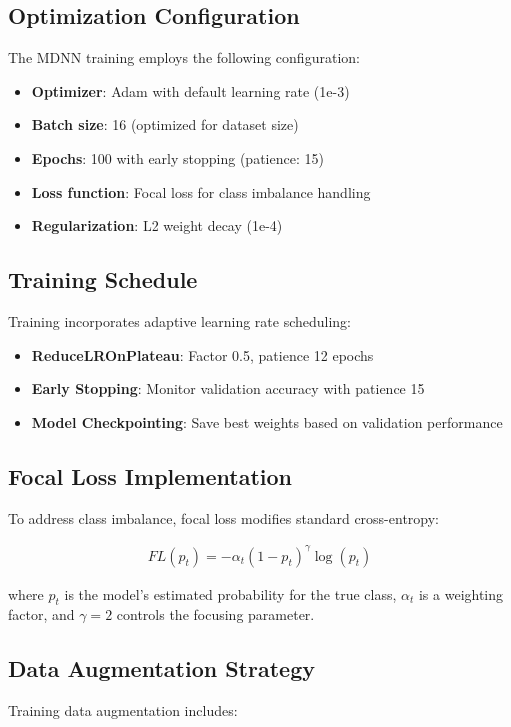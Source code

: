 \documentclass[12pt,a4paper]{article}
\begin{document}
\subsection{Optimization Configuration}
The MDNN training employs the following configuration:

\begin{itemize}
    \item \textbf{Optimizer}: Adam with default learning rate (1e-3)
    \item \textbf{Batch size}: 16 (optimized for dataset size)
    \item \textbf{Epochs}: 100 with early stopping (patience: 15)
    \item \textbf{Loss function}: Focal loss for class imbalance handling
    \item \textbf{Regularization}: L2 weight decay (1e-4)
\end{itemize}

\subsection{Training Schedule}
Training incorporates adaptive learning rate scheduling:

\begin{itemize}
    \item \textbf{ReduceLROnPlateau}: Factor 0.5, patience 12 epochs
    \item \textbf{Early Stopping}: Monitor validation accuracy with patience 15
    \item \textbf{Model Checkpointing}: Save best weights based on validation performance
\end{itemize}

\subsection{Focal Loss Implementation}
To address class imbalance, focal loss modifies standard cross-entropy:

\begin{align}
FL(p_t) = -\alpha_t(1-p_t)^\gamma \log(p_t)
\end{align}

where $p_t$ is the model's estimated probability for the true class, $\alpha_t$ is a weighting factor, and $\gamma=2$ controls the focusing parameter.

\subsection{Data Augmentation Strategy}
Training data augmentation includes:
\end{document}
